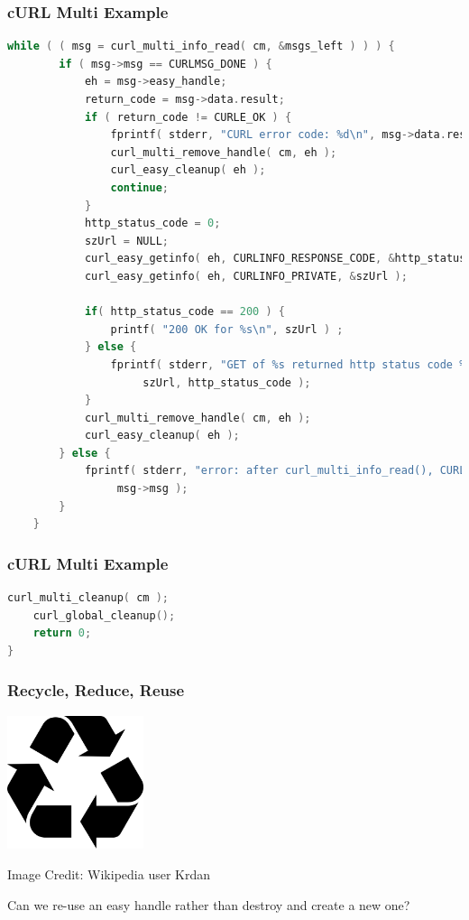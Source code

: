 \begin{frame}[fragile]
	\frametitle{cURL Multi Example}

	\begin{lstlisting}[language=C]
    while ( ( msg = curl_multi_info_read( cm, &msgs_left ) ) ) {
        if ( msg->msg == CURLMSG_DONE ) {
            eh = msg->easy_handle;
            return_code = msg->data.result;
            if ( return_code != CURLE_OK ) {
                fprintf( stderr, "CURL error code: %d\n", msg->data.result );
                curl_multi_remove_handle( cm, eh );
                curl_easy_cleanup( eh );
                continue;
            }
            http_status_code = 0;
            szUrl = NULL;
            curl_easy_getinfo( eh, CURLINFO_RESPONSE_CODE, &http_status_code );
            curl_easy_getinfo( eh, CURLINFO_PRIVATE, &szUrl );

            if( http_status_code == 200 ) {
                printf( "200 OK for %s\n", szUrl ) ;
            } else {
                fprintf( stderr, "GET of %s returned http status code %d\n",
                     szUrl, http_status_code );
            }
            curl_multi_remove_handle( cm, eh );
            curl_easy_cleanup( eh );
        } else {
            fprintf( stderr, "error: after curl_multi_info_read(), CURLMsg=%d\n",
                 msg->msg );
        }
    }
\end{lstlisting}

\end{frame}

\begin{frame}[fragile]
	\frametitle{cURL Multi Example}

	\begin{lstlisting}[language=C]
    curl_multi_cleanup( cm );
    curl_global_cleanup();
    return 0;
}
\end{lstlisting}

\end{frame}

\begin{frame}
	\frametitle{Recycle, Reduce, Reuse}

	\begin{center}
		\includegraphics[width=0.3\textwidth]{images/recycle.png}
	\end{center}
	\hfill Image Credit: Wikipedia user Krdan

	Can we re-use an easy handle rather than destroy and create a new one?

\end{frame}

